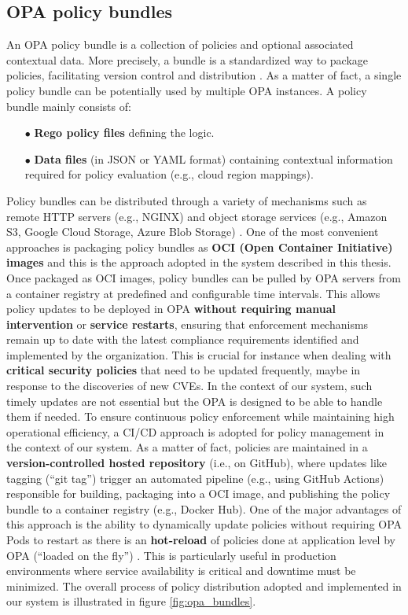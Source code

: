 \subsection{OPA policy bundles}
\label{sec:opa_bundles}

An OPA policy bundle is a collection of policies and optional associated contextual data. More precisely, a bundle is a standardized way to package policies, facilitating version control and distribution \cite{opa_bundles}. As a matter of fact, a single policy bundle can be potentially used by multiple OPA instances.
A policy bundle mainly consists of:
\begin{itemize}[itemsep=0.2pt, topsep=1pt]
  \item[$\bullet$] \textbf{Rego policy files} defining the logic.
  \item[$\bullet$] \textbf{Data files} (in JSON or YAML format) containing contextual information required for policy evaluation (e.g., cloud region mappings).
\end{itemize} 

Policy bundles can be distributed through a variety of mechanisms such as remote HTTP servers (e.g., NGINX) and object storage services (e.g., Amazon S3, Google Cloud Storage, Azure Blob Storage) \cite{opa_bundles}.
One of the most convenient approaches is packaging policy bundles as \textbf{OCI (Open Container Initiative) images} \cite{oci} and this is the approach adopted in the system described in this thesis.
Once packaged as OCI images, policy bundles can be pulled by OPA servers from a container registry at predefined and configurable time intervals. 
This allows policy updates to be deployed in OPA \textbf{without requiring manual intervention} or \textbf{service restarts}, ensuring that enforcement mechanisms remain up to date with the latest compliance requirements identified and implemented by the organization. 
This is crucial for instance when dealing with \textbf{critical security policies} that need to be updated frequently, maybe in response to the discoveries of new CVEs. 
In the context of our system, such timely updates are not essential but the OPA is designed to be able to handle them if needed.
To ensure continuous policy enforcement while maintaining high operational efficiency, a CI/CD approach is adopted for policy management in the context of our system.
As a matter of fact, policies are maintained in a \textbf{version-controlled hosted repository} (i.e., on GitHub), where updates like tagging (``git tag'') trigger an automated pipeline (e.g., using GitHub Actions) responsible for building, packaging into a OCI image, and publishing the policy bundle to a container registry (e.g., Docker Hub).
One of the major advantages of this approach is the ability to dynamically update policies without requiring OPA Pods to restart as there is an \textbf{hot-reload} of policies done at application level by OPA (``loaded on the fly'') \cite{opa_bundles}. 
This is particularly useful in production environments where service availability is critical and downtime must be minimized. 
The overall process of policy distribution adopted and implemented in our system is illustrated in figure \ref{fig:opa_bundles}.

